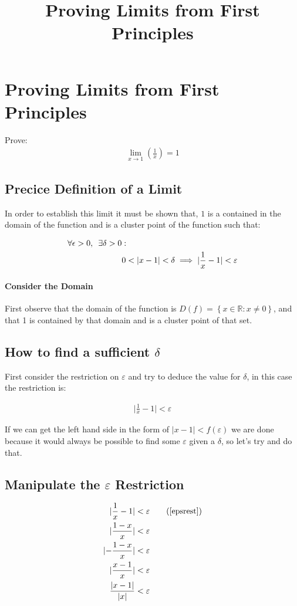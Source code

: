 \documentclass[class=article, crop=false]{standalone}
\title{Proving Limits from First Principles}
\begin{document}
\section{Proving Limits from First Principles}
Prove:
\begin{align}
  \lim_{ x \rightarrow 1 }\left( \frac{1}{x} \right) = 1
  \label{limdef}
\end{align}
\subsection{Precice Definition of a Limit}
In order to establish this limit it must be shown that, $1$ is a contained in the domain of the function and is a cluster point of the function such that:

\begin{align}
  \forall \epsilon > 0, \enspace \exists \delta > 0& : \notag \\
   &0 < \lvert x -1 \rvert < \delta \implies \lvert \frac{1}{x}-1 \rvert < \varepsilon
  \label{precdeflim}
\end{align}


\paragraph{Consider the Domain} First observe that the domain of the function is $D\left( f \right) = \left\{ x \in \mathbb{R} : x \neq 0 \right\}$, and that 1 is contained by that domain and is a cluster point of that set.

\subsection{How to find a sufficient $\delta$}
First consider the restriction on $\varepsilon$ and try to deduce the value for $\delta$, in this case the restriction is:

\begin{align}
  \lvert \frac{1}{x} - 1 \rvert < \varepsilon
  \label{epsrest}
\end{align}

If we can get the left hand side in the form of $\lvert x - 1 \rvert < f\left( \varepsilon \right)$ we are done because it would always be possible to find some $\varepsilon$ given a $\delta$, so let's try and do that.

\subsection{Manipulate the $\varepsilon$ Restriction}
\begin{align}
  \lvert \frac{1}{x} - 1 \rvert &< \varepsilon \tag{\ref{epsrest}} \\
  \lvert \frac{1-x}{x} \rvert &< \varepsilon \notag \\
  \lvert -\frac{1-x}{x} \rvert &< \varepsilon \notag \\
  \lvert \frac{x-1}{x} \rvert &< \varepsilon \notag \\
  \frac{\lvert x - 1 \rvert}{\vert x \rvert} &< \varepsilon \label{finalepsform}
\end{align}
\end{document}
